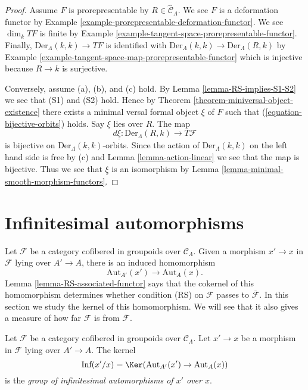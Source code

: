 \begin{proof}
Assume $F$ is prorepresentable by $R \in \widehat{\mathcal{C}}_\Lambda$.
We see $F$ is a deformation functor by
Example \ref{example-prorepresentable-deformation-functor}.
We see $\dim_k TF$ is finite by
Example \ref{example-tangent-space-prorepresentable-functor}.
Finally, $\text{Der}_\Lambda(k, k) \to TF$ is identified with
$\text{Der}_\Lambda(k, k) \to \text{Der}_\Lambda(R, k)$ by
Example \ref{example-tangent-space-map-prorepresentable-functor}
which is injective because $R \to k$ is surjective.

\medskip\noindent
Conversely, assume (a), (b), and (c) hold. By
Lemma \ref{lemma-RS-implies-S1-S2}
we see that (S1) and (S2) hold. Hence by
Theorem \ref{theorem-miniversal-object-existence}
there exists a minimal versal formal object $\xi$ of $F$ such that
(\ref{equation-bijective-orbits}) holds. Say $\xi$ lies over $R$.
The map
$$
d\underline{\xi} : \text{Der}_\Lambda(R, k) \to T\mathcal{F}
$$
is bijective on $\text{Der}_\Lambda(k, k)$-orbits. Since the action
of $\text{Der}_\Lambda(k, k)$ on the left hand side is free by (c) and
Lemma \ref{lemma-action-linear}
we see that the map is bijective. Thus we see that $\underline{\xi}$
is an isomorphism by
Lemma \ref{lemma-minimal-smooth-morphism-functors}.
\end{proof}




\section{Infinitesimal automorphisms}
\label{section-infinitesimal-automorphisms}

\noindent
Let $\mathcal{F}$ be a category cofibered in groupoids over
$\mathcal{C}_\Lambda$. Given a morphism $x' \to x$ in $\mathcal{F}$ lying over
$A' \to A$, there is an induced homomorphism
$$
\text{Aut}_{A'}(x') \to \text{Aut}_A(x).
$$
Lemma \ref{lemma-RS-associated-functor}
says that the cokernel of this homomorphism determines whether
condition (RS) on $\mathcal{F}$ passes to $\overline{\mathcal{F}}$.
In this section we study the kernel of this homomorphism. We will see
that it also gives a measure of how far $\mathcal{F}$
is from $\overline{\mathcal{F}}$.

\begin{definition}
\label{definition-relative-infinitesimal-auts}
Let $\mathcal{F}$ be a category cofibered in groupoids over $\mathcal
C_\Lambda$. Let $x' \to x$ be a morphism in $\mathcal{F}$ lying over
$A' \to A$. The kernel
$$
\text{Inf}(x'/x) = \Ker(\text{Aut}_{A'}(x') \to \text{Aut}_A(x))
$$
is the {\it group of infinitesimal automorphisms of $x'$ over $x$}.
\end{definition}

